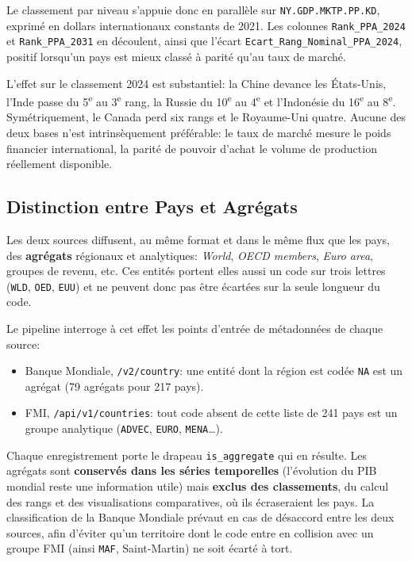 \documentclass[11pt,a4paper]{article}
\begin{document}
Le classement par niveau s'appuie donc en parallèle sur \texttt{NY.GDP.MKTP.PP.KD}, exprimé en dollars internationaux constants de 2021. Les colonnes \texttt{Rank\_PPA\_2024} et \texttt{Rank\_PPA\_2031} en découlent, ainsi que l'écart \texttt{Ecart\_Rang\_Nominal\_PPA\_2024}, positif lorsqu'un pays est mieux classé à parité qu'au taux de marché.

L'effet sur le classement 2024 est substantiel: la Chine devance les États-Unis, l'Inde passe du 5\textsuperscript{e} au 3\textsuperscript{e} rang, la Russie du 10\textsuperscript{e} au 4\textsuperscript{e} et l'Indonésie du 16\textsuperscript{e} au 8\textsuperscript{e}. Symétriquement, le Canada perd six rangs et le Royaume-Uni quatre. Aucune des deux bases n'est intrinsèquement préférable: le taux de marché mesure le poids financier international, la parité de pouvoir d'achat le volume de production réellement disponible.

\subsection{Distinction entre Pays et Agrégats}
Les deux sources diffusent, au même format et dans le même flux que les pays, des \textbf{agrégats} régionaux et analytiques: \textit{World}, \textit{OECD members}, \textit{Euro area}, groupes de revenu, etc. Ces entités portent elles aussi un code sur trois lettres (\texttt{WLD}, \texttt{OED}, \texttt{EUU}) et ne peuvent donc pas être écartées sur la seule longueur du code.

Le pipeline interroge à cet effet les points d'entrée de métadonnées de chaque source:
\begin{itemize}
    \item Banque Mondiale, \texttt{/v2/country}: une entité dont la région est codée \texttt{NA} est un agrégat (79 agrégats pour 217 pays).
    \item FMI, \texttt{/api/v1/countries}: tout code absent de cette liste de 241 pays est un groupe analytique (\texttt{ADVEC}, \texttt{EURO}, \texttt{MENA}\ldots).
\end{itemize}

Chaque enregistrement porte le drapeau \texttt{is\_aggregate} qui en résulte. Les agrégats sont \textbf{conservés dans les séries temporelles} (l'évolution du PIB mondial reste une information utile) mais \textbf{exclus des classements}, du calcul des rangs et des visualisations comparatives, où ils écraseraient les pays. La classification de la Banque Mondiale prévaut en cas de désaccord entre les deux sources, afin d'éviter qu'un territoire dont le code entre en collision avec un groupe FMI (ainsi \texttt{MAF}, Saint-Martin) ne soit écarté à tort.
\end{document}
